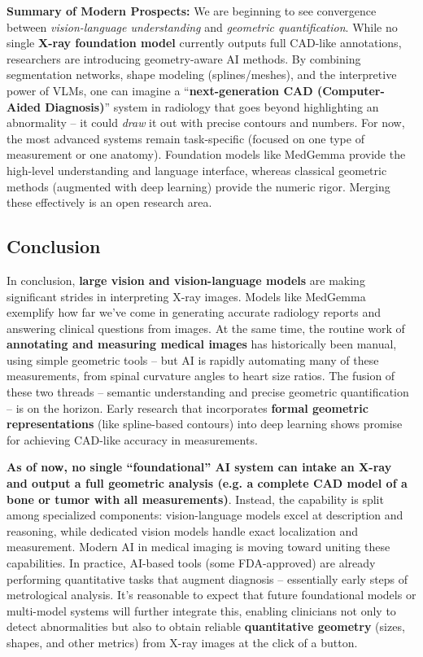 \documentclass[
]{article}
\begin{document}
\textbf{Summary of Modern Prospects:} We are beginning to see
convergence between \emph{vision-language understanding} and
\emph{geometric quantification}. While no single \textbf{X-ray
foundation model} currently outputs full CAD-like annotations,
researchers are introducing geometry-aware AI methods. By combining
segmentation networks, shape modeling (splines/meshes), and the
interpretive power of VLMs, one can imagine a ``\textbf{next-generation
CAD (Computer-Aided Diagnosis)}'' system in radiology that goes beyond
highlighting an abnormality -- it could \emph{draw} it out with precise
contours and numbers. For now, the most advanced systems remain
task-specific (focused on one type of measurement or one anatomy).
Foundation models like MedGemma provide the high-level understanding and
language
interface\cite{key-7},
whereas classical geometric methods (augmented with deep learning)
provide the numeric rigor. Merging these effectively is an open research
area.

\subsection{Conclusion}\label{conclusion}

In conclusion, \textbf{large vision and vision-language models} are
making significant strides in interpreting X-ray images. Models like
MedGemma exemplify how far we've come in generating accurate radiology
reports and answering clinical questions from
images\cite{key-4}.
At the same time, the routine work of \textbf{annotating and measuring
medical images} has historically been manual, using simple geometric
tools -- but AI is rapidly automating many of these measurements, from
spinal curvature
angles\cite{key-24}\cite{key-26}
to heart size
ratios\cite{key-34}.
The fusion of these two threads -- semantic understanding and precise
geometric quantification -- is on the horizon. Early research that
incorporates \textbf{formal geometric representations} (like
spline-based
contours\cite{key-38})
into deep learning shows promise for achieving CAD-like accuracy in
measurements.

\textbf{As of now, no single ``foundational'' AI system can intake an
X-ray and output a full geometric analysis (e.g. a complete CAD model of
a bone or tumor with all measurements)}. Instead, the capability is
split among specialized components: vision-language models excel at
description and reasoning, while dedicated vision models handle exact
localization and measurement. Modern AI in medical imaging is moving
toward uniting these capabilities. In practice, AI-based tools (some
FDA-approved) are already performing quantitative tasks that augment
diagnosis\cite{key-36}
-- essentially early steps of metrological analysis. It's reasonable to
expect that future foundational models or multi-model systems will
further integrate this, enabling clinicians not only to detect
abnormalities but also to obtain reliable \textbf{quantitative geometry}
(sizes, shapes, and other metrics) from X-ray images at the click of a
button.





\end{document}
